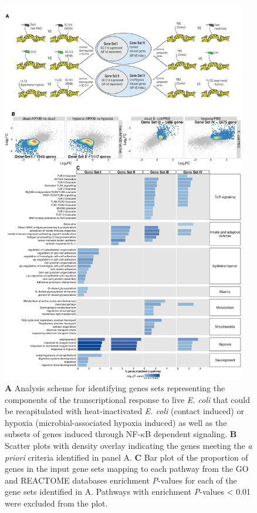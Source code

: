 \documentclass[9pt,lineo]{elife}
\begin{document}
\begin{figure}
\begin{fullwidth}
\centering
\includegraphics[width=0.95\textwidth]{./figures/figure4/figure4_multipanel.pdf}
\caption{\textbf{A} Analysis scheme for identifying genes sets representing the components of the transcriptional response to live \textit{E. coli} that could be recapitulated with heat-inactivated \textit{E. coli} (contact induced) or hypoxia (microbial-associated hypoxia induced) as well as the subsets of genes induced through NF-$\kappa$B dependent signaling. \textbf{B} Scatter plots with density overlay indicating the genes meeting the \textit{a priori} criteria identified in panel A. \textbf{C} Bar plot of the proportion of genes in the input gene sets mapping to each pathway from the GO and REACTOME databases enrichment \textit{P}-values for each of the gene sets identified in A. Pathways with enrichment \textit{P}-values < 0.01 were excluded from the plot.}
\label{fig:fullwidth}
\end{fullwidth}
\end{figure}
\end{document}

